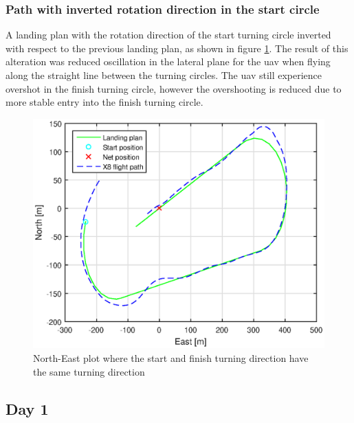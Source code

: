 \subsubsection{Path with inverted rotation direction in the start circle}
A landing plan with the rotation direction of the start turning circle inverted with respect to the previous landing plan, as shown in figure \ref{Fig:NorthEast31mai125420}. The result of this alteration was reduced oscillation in the lateral plane for the \gls{uav} when flying along the straight line between the turning circles. The \gls{uav} still experience overshot in the finish turning circle, however the overshooting is reduced due to more stable entry into the finish turning circle.
\begin{figure}[H]
	\centering
	\includegraphics[scale=0.7]{figs/Experiment/NorthEast31mai125420.eps}
	\caption{North-East plot where the start and finish turning direction have the same turning direction}
	\label{Fig:NorthEast31mai125420}
\end{figure}

\subsection{Day 1}
